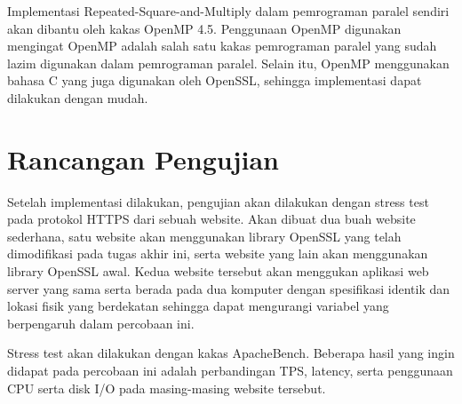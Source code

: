 Implementasi Repeated-Square-and-Multiply dalam pemrograman paralel sendiri akan dibantu oleh kakas OpenMP 4.5. Penggunaan OpenMP digunakan mengingat OpenMP adalah salah satu kakas pemrograman paralel yang sudah lazim digunakan dalam pemrograman paralel. Selain itu, OpenMP menggunakan bahasa C yang juga digunakan oleh OpenSSL, sehingga implementasi dapat dilakukan dengan mudah.

\section{Rancangan Pengujian}
Setelah implementasi dilakukan, pengujian akan dilakukan dengan stress test pada protokol HTTPS dari sebuah website. Akan dibuat dua buah website sederhana, satu website akan menggunakan library OpenSSL yang telah dimodifikasi pada tugas akhir ini, serta website yang lain akan menggunakan library OpenSSL awal. Kedua website tersebut akan menggukan aplikasi web server yang sama serta berada pada dua komputer dengan spesifikasi identik dan lokasi fisik yang berdekatan sehingga dapat mengurangi variabel yang berpengaruh dalam percobaan ini.

Stress test akan dilakukan dengan kakas ApacheBench. Beberapa hasil yang ingin didapat pada percobaan ini adalah perbandingan TPS, latency, serta penggunaan CPU serta disk I/O pada masing-masing website tersebut.

